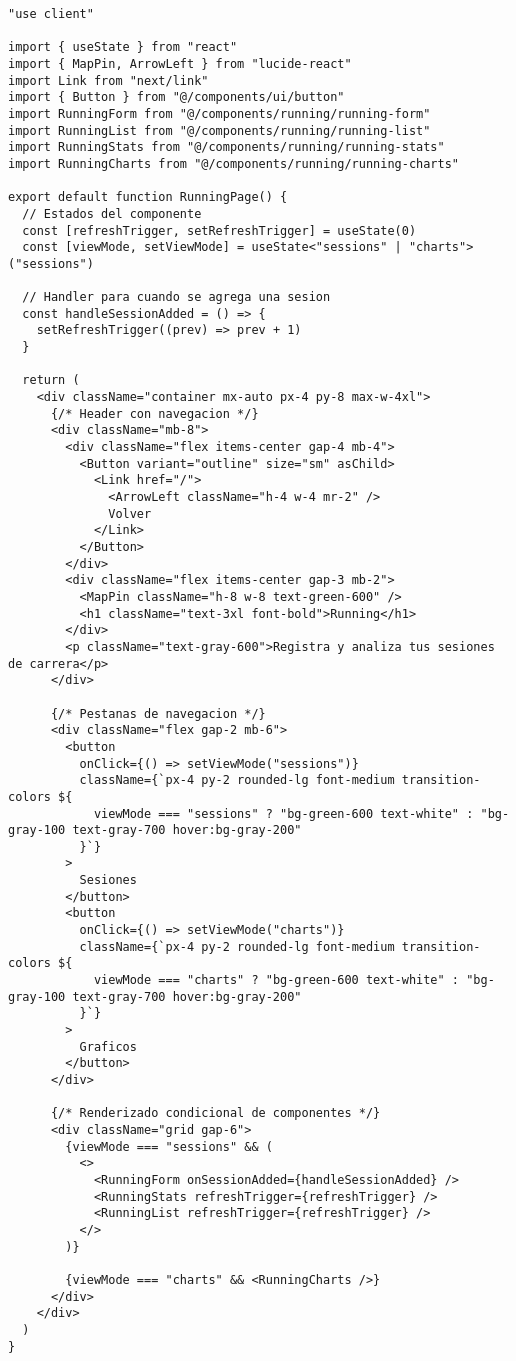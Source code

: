 \documentclass[12pt,a4paper]{article}
\begin{document}
\begin{lstlisting}[caption=app/running/page.tsx - Estructura completa]
"use client"

import { useState } from "react"
import { MapPin, ArrowLeft } from "lucide-react"
import Link from "next/link"
import { Button } from "@/components/ui/button"
import RunningForm from "@/components/running/running-form"
import RunningList from "@/components/running/running-list"
import RunningStats from "@/components/running/running-stats"
import RunningCharts from "@/components/running/running-charts"

export default function RunningPage() {
  // Estados del componente
  const [refreshTrigger, setRefreshTrigger] = useState(0)
  const [viewMode, setViewMode] = useState<"sessions" | "charts">("sessions")

  // Handler para cuando se agrega una sesion
  const handleSessionAdded = () => {
    setRefreshTrigger((prev) => prev + 1)
  }

  return (
    <div className="container mx-auto px-4 py-8 max-w-4xl">
      {/* Header con navegacion */}
      <div className="mb-8">
        <div className="flex items-center gap-4 mb-4">
          <Button variant="outline" size="sm" asChild>
            <Link href="/">
              <ArrowLeft className="h-4 w-4 mr-2" />
              Volver
            </Link>
          </Button>
        </div>
        <div className="flex items-center gap-3 mb-2">
          <MapPin className="h-8 w-8 text-green-600" />
          <h1 className="text-3xl font-bold">Running</h1>
        </div>
        <p className="text-gray-600">Registra y analiza tus sesiones de carrera</p>
      </div>

      {/* Pestanas de navegacion */}
      <div className="flex gap-2 mb-6">
        <button
          onClick={() => setViewMode("sessions")}
          className={`px-4 py-2 rounded-lg font-medium transition-colors ${
            viewMode === "sessions" ? "bg-green-600 text-white" : "bg-gray-100 text-gray-700 hover:bg-gray-200"
          }`}
        >
          Sesiones
        </button>
        <button
          onClick={() => setViewMode("charts")}
          className={`px-4 py-2 rounded-lg font-medium transition-colors ${
            viewMode === "charts" ? "bg-green-600 text-white" : "bg-gray-100 text-gray-700 hover:bg-gray-200"
          }`}
        >
          Graficos
        </button>
      </div>

      {/* Renderizado condicional de componentes */}
      <div className="grid gap-6">
        {viewMode === "sessions" && (
          <>
            <RunningForm onSessionAdded={handleSessionAdded} />
            <RunningStats refreshTrigger={refreshTrigger} />
            <RunningList refreshTrigger={refreshTrigger} />
          </>
        )}

        {viewMode === "charts" && <RunningCharts />}
      </div>
    </div>
  )
}
\end{lstlisting}
\end{document}
